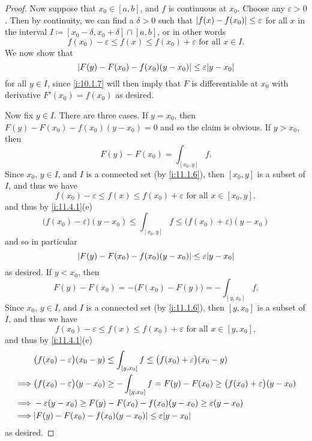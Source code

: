 \begin{proof}
  Now suppose that \(x_0 \in [a, b]\), and \(f\) is continuous at \(x_0\).
  Choose any \(\varepsilon > 0\).
  Then by continuity, we can find a \(\delta > 0\) such that \(\left\lvert f(x) - f(x_0)\right\rvert \leq \varepsilon\) for all \(x\) in the interval \(I \coloneqq [x_0 - \delta, x_0 + \delta] \cap [a, b]\), or in other words
  \[
    f(x_0) - \varepsilon \leq f(x) \leq f(x_0) + \varepsilon \text{ for all } x \in I.
  \]
  We now show that
  \[
    \abs{F(y) - F(x_0) - f(x_0)(y - x_0)} \leq \varepsilon \abs{y - x_0}
  \]
  for all \(y \in I\), since \cref{i:10.1.7} will then imply that \(F\) is differentiable at \(x_0\) with derivative \(F'(x_0) = f(x_0)\) as desired.

  Now fix \(y \in I\).
  There are three cases.
  If \(y = x_0\), then \(F(y) - F(x_0) - f(x_0)(y - x_0) = 0\) and so the claim is obvious.
  If \(y > x_0\), then
  \[
    F(y) - F(x_0) = \int_{[x_0, y]} f.
  \]
  Since \(x_0\), \(y \in I\), and \(I\) is a connected set (by \cref{i:11.1.6}), then \([x_0, y]\) is a subset of \(I\), and thus we have
  \[
    f(x_0) - \varepsilon \leq f(x) \leq f(x_0) + \varepsilon \text{ for all } x \in [x_0, y],
  \]
  and thus by \cref{i:11.4.1}(e)
  \[
    \big(f(x_0) - \varepsilon\big) (y - x_0) \leq \int_{[x_0, y]} f \leq \big(f(x_0) + \varepsilon\big) (y - x_0)
  \]
  and so in particular
  \[
    \abs{F(y) - F(x_0) - f(x_0)(y - x_0)} \leq \varepsilon \abs{y - x_0}
  \]
  as desired.
  If \(y < x_0\), then
  \[
    F(y) - F(x_0) = -\big(F(x_0) - F(y)\big) = -\int_{[y, x_0]} f.
  \]
  Since \(x_0\), \(y \in I\), and \(I\) is a connected set (by \cref{i:11.1.6}), then \([y, x_0]\) is a subset of \(I\), and thus we have
  \[
    f(x_0) - \varepsilon \leq f(x) \leq f(x_0) + \varepsilon \text{ for all } x \in [y, x_0],
  \]
  and thus by \cref{i:11.4.1}(e)
  \begin{align*}
             & \big(f(x_0) - \varepsilon\big) (x_0 - y) \leq \int_{[y, x_0]} f \leq \big(f(x_0) + \varepsilon\big) (x_0 - y)                  \\
    \implies & \big(f(x_0) - \varepsilon\big) (y - x_0) \geq -\int_{[y, x_0]} f = F(y) - F(x_0) \geq \big(f(x_0) + \varepsilon\big) (y - x_0) \\
    \implies & -\varepsilon (y - x_0) \geq F(y) - F(x_0) - f(x_0)(y - x_0) \geq \varepsilon (y - x_0)                                         \\
    \implies & \abs{F(y) - F(x_0) - f(x_0)(y - x_0)} \leq \varepsilon \abs{y - x_0}
  \end{align*}
  as desired.
\end{proof}

